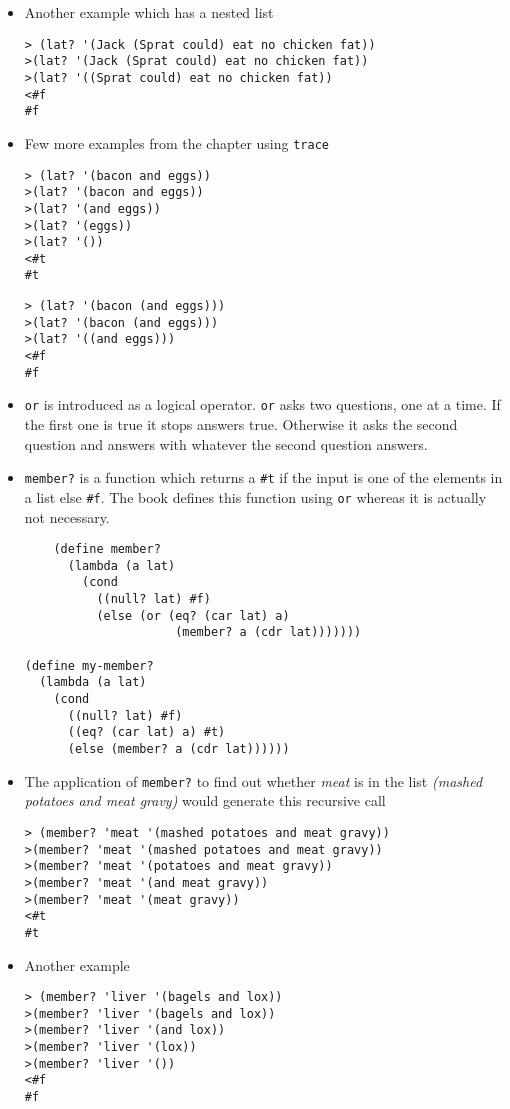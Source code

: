 \documentclass[11pt]{article}
\begin{document}
\begin{itemize}
\begin{verbatim}
\end{verbatim}

\item Another example which has a nested list
\begin{verbatim}
> (lat? '(Jack (Sprat could) eat no chicken fat))
>(lat? '(Jack (Sprat could) eat no chicken fat))
>(lat? '((Sprat could) eat no chicken fat))
<#f
#f

\end{verbatim}
\item Few more examples from the chapter using \texttt{trace}
\begin{verbatim}
> (lat? '(bacon and eggs))
>(lat? '(bacon and eggs))
>(lat? '(and eggs))
>(lat? '(eggs))
>(lat? '())
<#t
#t

\end{verbatim}

\begin{verbatim}
> (lat? '(bacon (and eggs)))
>(lat? '(bacon (and eggs)))
>(lat? '((and eggs)))
<#f
#f

\end{verbatim}
\item \texttt{or} is introduced as a logical operator. \texttt{or} asks two questions, one at a time. If the first one is true it stops
answers true. Otherwise it asks the second question and answers with whatever the second question answers.
\item \texttt{member?} is a function which returns a \texttt{\#t} if the input is one of the elements in a list else \texttt{\#f}. The book
defines this function using \texttt{or} whereas it is actually not necessary.
\begin{verbatim}
    (define member?
      (lambda (a lat)
        (cond
          ((null? lat) #f)
          (else (or (eq? (car lat) a)
                     (member? a (cdr lat)))))))

(define my-member?
  (lambda (a lat)
    (cond
      ((null? lat) #f)
      ((eq? (car lat) a) #t)
      (else (member? a (cdr lat))))))

\end{verbatim}
\item The application of \texttt{member?} to find out whether \emph{meat} is in the list \emph{(mashed potatoes and meat gravy)} would
generate this recursive call
\begin{verbatim}
> (member? 'meat '(mashed potatoes and meat gravy))
>(member? 'meat '(mashed potatoes and meat gravy))
>(member? 'meat '(potatoes and meat gravy))
>(member? 'meat '(and meat gravy))
>(member? 'meat '(meat gravy))
<#t
#t

\end{verbatim}
\item Another example
\begin{verbatim}
> (member? 'liver '(bagels and lox))
>(member? 'liver '(bagels and lox))
>(member? 'liver '(and lox))
>(member? 'liver '(lox))
>(member? 'liver '())
<#f
#f

\end{verbatim}
\end{itemize}
\end{document}
